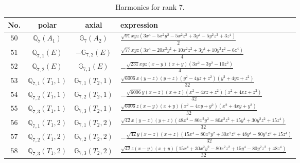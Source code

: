 \documentclass[fleqn,8pt,landscape]{jsarticle}
\begin{document}
\begin{table}[ht!]
\begin{center}
\caption{Harmonics for rank 7.}
\renewcommand{\arraystretch}{1.3}
\begin{tabular}{cccl} \hline \hline
No. & polar & axial & expression \\ \hline
$ 50 $ & $ \mathbb{Q}_{7}(A_{1}) $ & $ \mathbb{G}_{7}(A_{2}) $ & $ \frac{\sqrt{91} x y z \left(3 x^{4} - 5 x^{2} y^{2} - 5 x^{2} z^{2} + 3 y^{4} - 5 y^{2} z^{2} + 3 z^{4}\right)}{2} $ \\
$ 51 $ & $ \mathbb{Q}_{7,1}(E) $ & $ -\mathbb{G}_{7,2}(E) $ & $ \frac{\sqrt{77} x y z \left(3 x^{4} - 20 x^{2} y^{2} + 10 x^{2} z^{2} + 3 y^{4} + 10 y^{2} z^{2} - 6 z^{4}\right)}{4} $ \\
$ 52 $ & $ \mathbb{Q}_{7,2}(E) $ & $ \mathbb{G}_{7,1}(E) $ & $ - \frac{\sqrt{231} x y z \left(x - y\right) \left(x + y\right) \left(3 x^{2} + 3 y^{2} - 10 z^{2}\right)}{4} $ \\
$ 53 $ & $ \mathbb{Q}_{7,1}(T_{1},1) $ & $ \mathbb{G}_{7,1}(T_{2},1) $ & $ \frac{\sqrt{6006} x \left(y - z\right) \left(y + z\right) \left(y^{2} - 4 y z + z^{2}\right) \left(y^{2} + 4 y z + z^{2}\right)}{32} $ \\
$ 54 $ & $ \mathbb{Q}_{7,2}(T_{1},1) $ & $ \mathbb{G}_{7,2}(T_{2},1) $ & $ - \frac{\sqrt{6006} y \left(x - z\right) \left(x + z\right) \left(x^{2} - 4 x z + z^{2}\right) \left(x^{2} + 4 x z + z^{2}\right)}{32} $ \\
$ 55 $ & $ \mathbb{Q}_{7,3}(T_{1},1) $ & $ \mathbb{G}_{7,3}(T_{2},1) $ & $ \frac{\sqrt{6006} z \left(x - y\right) \left(x + y\right) \left(x^{2} - 4 x y + y^{2}\right) \left(x^{2} + 4 x y + y^{2}\right)}{32} $ \\
$ 56 $ & $ \mathbb{Q}_{7,1}(T_{1},2) $ & $ \mathbb{G}_{7,1}(T_{2},2) $ & $ \frac{\sqrt{42} x \left(y - z\right) \left(y + z\right) \left(48 x^{4} - 80 x^{2} y^{2} - 80 x^{2} z^{2} + 15 y^{4} + 30 y^{2} z^{2} + 15 z^{4}\right)}{32} $ \\
$ 57 $ & $ \mathbb{Q}_{7,2}(T_{1},2) $ & $ \mathbb{G}_{7,2}(T_{2},2) $ & $ - \frac{\sqrt{42} y \left(x - z\right) \left(x + z\right) \left(15 x^{4} - 80 x^{2} y^{2} + 30 x^{2} z^{2} + 48 y^{4} - 80 y^{2} z^{2} + 15 z^{4}\right)}{32} $ \\
$ 58 $ & $ \mathbb{Q}_{7,3}(T_{1},2) $ & $ \mathbb{G}_{7,3}(T_{2},2) $ & $ \frac{\sqrt{42} z \left(x - y\right) \left(x + y\right) \left(15 x^{4} + 30 x^{2} y^{2} - 80 x^{2} z^{2} + 15 y^{4} - 80 y^{2} z^{2} + 48 z^{4}\right)}{32} $ \\

\end{tabular}
\end{center}
\end{table}
\end{document}
